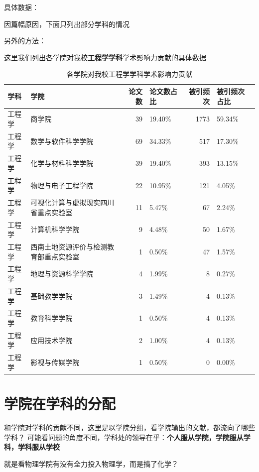 \documentclass[cn, 11pt, fancy, hide]{elegantbook}
\begin{document}
具体数据：

因篇幅原因，下面只列出部分学科的情况

另外的方法：

这里我们列出各学院对我校\textbf{工程学学科}学术影响力贡献的具体数据

\begin{table}[!h]

\caption{\label{tab:unnamed-chunk-36}各学院对我校工程学学科学术影响力贡献}
\centering
\begin{tabular}[t]{llrlrl}
\toprule
学科 & 学院 & 论文数 & 论文数占比 & 被引频次 & 被引频次占比\\
\midrule
工程学 & 商学院 & 39 & 19.40\% & 1773 & 59.34\%\\
工程学 & 数学与软件科学学院 & 69 & 34.33\% & 517 & 17.30\%\\
工程学 & 化学与材料科学学院 & 39 & 19.40\% & 393 & 13.15\%\\
工程学 & 物理与电子工程学院 & 22 & 10.95\% & 121 & 4.05\%\\
工程学 & 可视化计算与虚拟现实四川省重点实验室 & 11 & 5.47\% & 67 & 2.24\%\\
\addlinespace
工程学 & 计算机科学学院 & 9 & 4.48\% & 50 & 1.67\%\\
工程学 & 西南土地资源评价与检测教育部重点实验室 & 1 & 0.50\% & 47 & 1.57\%\\
工程学 & 地理与资源科学学院 & 4 & 1.99\% & 8 & 0.27\%\\
工程学 & 基础教学学院 & 3 & 1.49\% & 4 & 0.13\%\\
工程学 & 教育科学学院 & 1 & 0.50\% & 4 & 0.13\%\\
\addlinespace
工程学 & 应用技术学院 & 2 & 1.00\% & 4 & 0.13\%\\
工程学 & 影视与传媒学院 & 1 & 0.50\% & 0 & 0.00\%\\
\bottomrule
\end{tabular}
\end{table}

\hypertarget{ux5b66ux9662ux5728ux5b66ux79d1ux7684ux5206ux914d}{%
\section{学院在学科的分配}\label{ux5b66ux9662ux5728ux5b66ux79d1ux7684ux5206ux914d}}

和学院对学科的贡献不同，这里是以学院分组，看学院输出的文献，都流向了哪些学科？
可能看问题的角度不同，学科处的领导在乎：\textbf{个人服从学院，学院服从学科，学科服从学校}

就是看物理学院有没有全力投入物理学，而是搞了化学？
\end{document}
